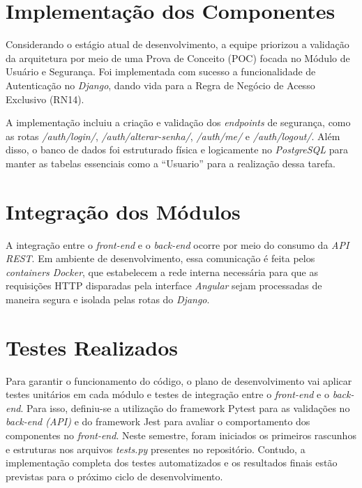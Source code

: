 
\section{Implementação dos Componentes}
Considerando o estágio atual de desenvolvimento, a equipe priorizou a validação da arquitetura por meio de uma Prova de Conceito (POC) focada no Módulo de Usuário e Segurança. Foi implementada com sucesso a funcionalidade de Autenticação no \textit{Django}, dando vida para a Regra de Negócio de Acesso Exclusivo (RN14).

A implementação incluiu a criação e validação dos \textit{endpoints} de segurança, como as rotas \textit{/auth/login/}, \textit{/auth/alterar-senha/}, \textit{/auth/me/} e \textit{/auth/logout/}. Além disso, o banco de dados foi estruturado física e logicamente no \textit{PostgreSQL} para manter as tabelas essenciais como a “Usuario” para a realização dessa tarefa.

\section{Integração dos Módulos}
A integração entre o \textit{front-end} e o \textit{back-end} ocorre por meio do consumo da \textit{API REST}. Em ambiente de desenvolvimento, essa comunicação é feita pelos \textit{containers Docker}, que estabelecem a rede interna necessária para que as requisições HTTP disparadas pela interface \textit{Angular} sejam processadas de maneira segura e isolada pelas rotas do \textit{Django}.


\section{Testes Realizados}
Para garantir o funcionamento do código, o plano de desenvolvimento vai aplicar testes unitários em cada módulo e testes de integração entre o \textit{front-end} e o \textit{back-end}. Para isso, definiu-se a utilização do framework Pytest para as validações no \textit{back-end (API)} e do framework Jest para avaliar o comportamento dos componentes no \textit{front-end}. Neste semestre, foram iniciados os primeiros rascunhos e estruturas nos arquivos \textit{tests.py} presentes no repositório. Contudo, a implementação completa dos testes automatizados e os resultados finais estão previstas para o próximo ciclo de desenvolvimento.


